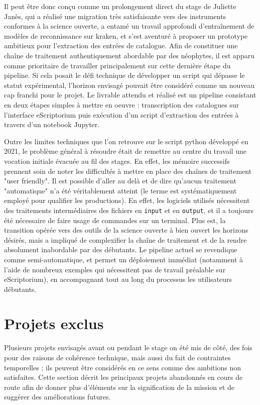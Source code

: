 \documentclass[a4paper,12pt,twoside]{book}
\begin{document}
Il peut être donc conçu comme un prolongement direct du stage de Juliette Janès, qui a réalisé une migration très satisfaisante vers des instruments conformes à la science ouverte, a entamé un travail approfondi d'entraînement de modèles de reconnissance sur kraken, et s'est aventuré à proposer un prototype ambitieux pour l'extraction des entrées de catalogue. Afin de constituer une chaîne de traitement authentiquement abordable par des néophytes, il est apparu comme prioritaire de travailler principalement sur cette dernière étape du pipeline. Si cela posait le défi technique de développer un script qui dépasse le statut expérimental, l'horizon envisagé pouvait être considéré comme un nouveau cap franchi pour le projet. Le livrable attendu et réalisé est un pipeline consistant en deux étapes  simples à mettre en oeuvre : transcription des catalogues sur l'interface eScriptorium puis exécution d'un script d'extraction des entrées à travers d'un notebook Jupyter.

Outre les limites techniques que l'on retrouve sur le script python développé en 2021, le problème général à résoudre était de remettre au centre du travail une vocation initiale évacuée au fil des stages. En effet, les mémoire successifs prennent soin de noter les difficultés à mettre en place des chaînes de traitement "user friendly". Il est possible d'aller au delà et de dire qu'aucun traitement "automatique" n'a été véritablement atteint (le terme est systématiquement employé pour qualifier les productions). En effet, les logiciels utilisés nécessitent des traitements intermédiaires des fichiers en \texttt{input} et en \texttt{output}, et il a toujours été nécessaire de faire usage de commandes sur un terminal. Plus est, la transition opérée vers des outils de la science ouverte à bien ouvert les horizons désirés, mais a impliqué de complexifier la chaîne de traitement et de la rendre absolument inabordable par des débutants. Le pipeline actuel se revendique comme semi-automatique, et permet un déploiement immédiat (notamment à l'aide de nombreux exemples qui nécessitent pas de travail préalable sur eScriptorium), en accompagnant tout au long du processus les utilisateurs débutants.

\section{Projets exclus}

Plusieurs projets envisagés avant ou pendant le stage on été mis de côté, des fois pour des raisons de cohérence technique, mais aussi du fait de contraintes temporelles ; ils peuvent être considérés en ce sens comme des ambitions non satisfaites. Cette section décrit les principaux projets abandonnés en cours de route afin de donner plus d'éléments sur la signification de la mission et de suggérer des améliorations futures. 
\end{document}
